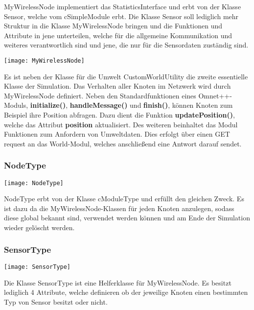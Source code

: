 MyWirelessNode implementiert das StatisticsInterface und erbt von der Klasse Sensor, welche vom cSimpleModule erbt. Die Klasse Sensor soll lediglich mehr Struktur in die Klasse MyWirelessNode bringen und die Funktionen und Attribute in jene unterteilen, welche für die allgemeine Kommunikation und weiteres verantwortlich sind und jene, die nur für die Sensordaten zuständig sind. \newline

\begin{center}
\texttt{[image: MyWirelessNode]}
\end{center}

Es ist neben der Klasse für die Umwelt CustomWorldUtility die zweite essentielle Klasse der Simulation. Das Verhalten aller Knoten im Netzwerk wird durch MyWirelessNode definiert. Neben den Standardfunktionen eines Omnet++-Moduls, \textbf{initialize()}, \textbf{handleMessage()} und \textbf{finish()}, können Knoten zum Beispiel ihre Position abfragen. \newline
Dazu dient die Funktion \textbf{updatePosition()}, welche das Attribut \textbf{position} aktualisiert. Des weiteren beinhaltet das Modul Funktionen zum Anfordern von Umweltdaten. Dies erfolgt über einen GET request an das World-Modul, welches anschließend eine Antwort darauf sendet.

\subsubsection{NodeType}

\begin{center}
\texttt{[image: NodeType]}
\end{center}

NodeType erbt von der Klasse cModuleType und erfüllt den gleichen Zweck. Es ist dazu da die MyWirelessNode-Klassen für jeden Knoten anzulegen, sodass diese global bekannt sind, verwendet werden können und am Ende der Simulation wieder gelöscht werden.

\subsubsection{SensorType}

\begin{center}
\texttt{[image: SensorType]}
\end{center}

Die Klasse SensorType ist eine Helferklasse für MyWirelessNode. Es besitzt lediglich 4 Attribute, welche definieren ob der jeweilige Knoten einen bestimmten Typ von Sensor besitzt oder nicht.

